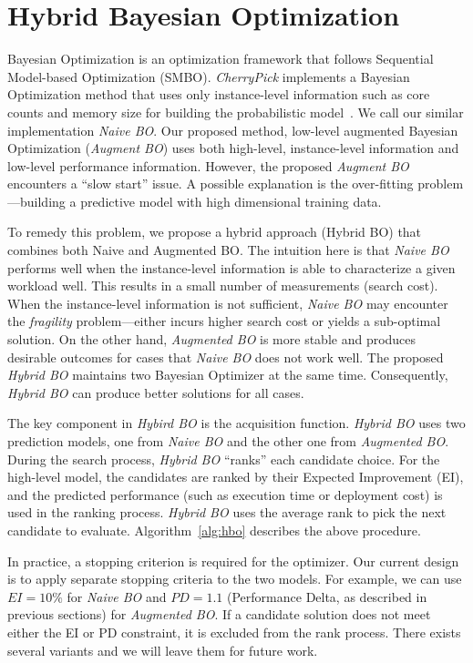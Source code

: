 \section{Hybrid Bayesian Optimization}
\label{sec:arrow::hybrid}

Bayesian Optimization is an optimization framework that follows
Sequential Model-based Optimization (SMBO).
\emph{CherryPick} implements a Bayesian Optimization method that uses only instance-level information such as core counts and memory size for building the probabilistic model~\cite{Alipourfard2017}.
We call our similar implementation \emph{Naive BO}.
Our proposed method, low-level augmented Bayesian Optimization (\emph{Augment BO}) uses both high-level, instance-level information and low-level performance information.
However, the proposed \emph{Augment BO} encounters a ``slow start'' issue.
A possible explanation is the over-fitting problem---building a predictive model with high dimensional training data.

To remedy this problem, we propose a hybrid approach (Hybrid BO) that combines both Naive and Augmented BO.
The intuition here is that \emph{Naive BO} performs well when the instance-level information is able to characterize a given workload well.
This results in a small number of measurements (search cost).
When the instance-level information is not sufficient, \emph{Naive BO} may encounter the \emph{fragility} problem---either incurs higher search cost or yields a sub-optimal solution.
On the other hand, \emph{Augmented BO} is more stable and produces desirable outcomes for cases that \emph{Naive BO} does not work well.
The proposed \emph{Hybrid BO} maintains two Bayesian Optimizer at the same time.
Consequently, \emph{Hybrid BO} can produce better solutions for all cases.

The key component in \emph{Hybird BO} is the acquisition function.
\emph{Hybrid BO} uses two prediction models, one from \emph{Naive BO} and the other one from \emph{Augmented BO}.
During the search process, \emph{Hybrid BO} ``ranks'' each candidate choice.
For the high-level model, the candidates are ranked by their Expected Improvement (EI), and the predicted performance (such as execution time or deployment cost) is used in the ranking process.
\emph{Hybrid BO} uses the average rank to pick the next candidate to evaluate.
Algorithm~\ref{alg:hbo} describes the above procedure.

In practice, a stopping criterion is required for the optimizer.
Our current design is to apply separate stopping criteria to the two models.
For example, we can use $EI=10\%$ for \emph{Naive BO} and $PD=1.1$
(Performance Delta, as described in previous sections) for \emph{Augmented BO}.
If a candidate solution does not meet either the EI or PD constraint,
it is excluded from the rank process.
There exists several variants and we will leave them for future work.

